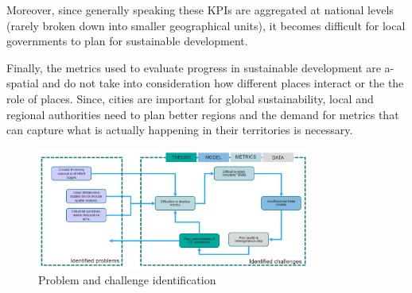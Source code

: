 Moreover, since generally speaking these KPIs are aggregated at national levels (rarely broken down into smaller geographical units), it becomes difficult for local governments to plan for sustainable development. \par 
Finally, the metrics used to evaluate progress in sustainable development are a-spatial and do not take into consideration how different places interact or the the role of places. Since, cities are important for global sustainability, local and regional authorities need to plan better regions and the demand for metrics that can capture what is actually happening in their territories is necessary. 



\begin{figure}[h!]
    \centering
    \includegraphics[width=0.8\textwidth]{sections/asset/challenge_probs.PNG}
    \caption{Problem and challenge identification}
    \label{fig:problems}
\end{figure}


